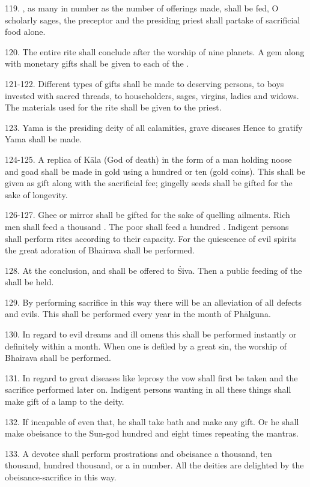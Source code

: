119. , as many in number as the number of offerings made, shall be
fed, O scholarly sages, the preceptor and the presiding priest shall partake of
sacrificial food alone.

120. The entire rite shall conclude after the worship of nine planets. A gem
along with monetary gifts shall be given to each of the .

121-122. Different types of gifts shall be made to deserving persons, to boys
invested with sacred threads, to householders, sages, virgins, ladies and widows.
The materials used for the rite shall be given to the priest.

123. Yama is the presiding deity of all calamities, grave diseases \etc Hence to
gratify Yama  shall be made.

124-125. A replica of Kāla (God of death) in the form of a man holding noose and
goad shall be made in gold using a hundred or ten  (gold coins). This
shall be given as gift along with the sacrificial fee; gingelly seeds shall be
gifted for the sake of longevity.

126-127. Ghee or mirror shall be gifted for the sake of quelling ailments. Rich
men shall feed a thousand . The poor shall feed a hundred
. Indigent persons shall perform rites according to their capacity.
For the quiescence of evil spirits the great adoration of Bhairava shall be
performed.

128. At the conclusion,  and  shall be offered to
Śiva. Then a public feeding of the  shall be held.

129. By performing sacrifice in this way there will be an alleviation of all
defects and evils. This  shall be performed every year in
the month of Phālguna.

130. In regard to evil dreams and ill omens this shall be performed instantly or
definitely within a month. When one is defiled by a great sin, the worship of
Bhairava shall be performed.

131. In regard to great diseases like leprosy \etc the vow shall first be taken
and the sacrifice performed later on. Indigent persons wanting in all these
things shall make gift of a lamp to the deity.

132. If incapable of even that, he shall take bath and make any gift. Or he
shall make obeisance to the Sun-god hundred and eight times repeating
the mantras.

133. A devotee shall perform prostrations and obeisance a thousand, ten thousand,
hundred thousand, or a  in number. All the deities are delighted by
the obeisance-sacrifice in this way.

